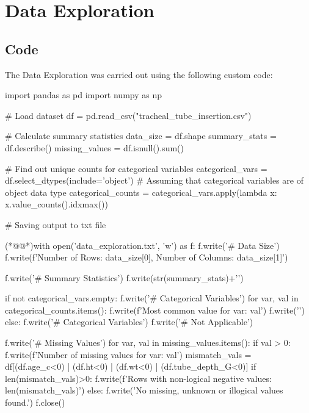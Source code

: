 \documentclass[11pt]{article}
\begin{document}
\section{Data Exploration}
\subsection{{Code}}
The Data Exploration was carried out using the following custom code:

\begin{python}

import pandas as pd
import numpy as np

# Load dataset
df = pd.read_csv("tracheal_tube_insertion.csv") 

# Calculate summary statistics
data_size = df.shape
summary_stats = df.describe()
missing_values = df.isnull().sum()

# Find out unique counts for categorical variables
categorical_vars = df.select_dtypes(include='object') # Assuming that categorical variables are of object data type
categorical_counts = categorical_vars.apply(lambda x: x.value_counts().idxmax())

# Saving output to txt file

(*@@*)with open('data_exploration.txt', 'w') as f:
    f.write('# Data Size\n')
    f.write(f'Number of Rows: {data_size[0]}, Number of Columns: {data_size[1]}\n\n')

    f.write('# Summary Statistics\n')
    f.write(str(summary_stats)+'\n\n')

    if not categorical_vars.empty:
        f.write('# Categorical Variables\n')
        for var, val in categorical_counts.items():
            f.write(f'Most common value for {var}: {val}\n')
        f.write('\n')
    else:
        f.write('# Categorical Variables\n')
        f.write('# Not Applicable\n\n')

    f.write('# Missing Values\n')
    for var, val in missing_values.items():
        if val > 0:
            f.write(f'Number of missing values for {var}: {val}\n')
    mismatch_vals = df[(df.age_c<0) | (df.ht<0) | (df.wt<0) | (df.tube_depth_G<0)]
    if len(mismatch_vals)>0:
        f.write(f'Rows with non-logical negative values: {len(mismatch_vals)}\n')
    else:
        f.write('No missing, unknown or illogical values found.\n')
    f.close()

\end{python}
\end{document}
